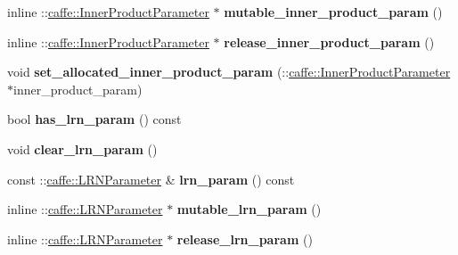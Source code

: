 \begin{DoxyCompactItemize}
inline \+::\mbox{\hyperlink{classcaffe_1_1_inner_product_parameter}{caffe\+::\+Inner\+Product\+Parameter}} $\ast$ {\bfseries mutable\+\_\+inner\+\_\+product\+\_\+param} ()
\item 
\mbox{\label{classcaffe_1_1_v1_layer_parameter_a778f2e5d0dff3de9b4e04279e3172027}} 
inline \+::\mbox{\hyperlink{classcaffe_1_1_inner_product_parameter}{caffe\+::\+Inner\+Product\+Parameter}} $\ast$ {\bfseries release\+\_\+inner\+\_\+product\+\_\+param} ()
\item 
\mbox{\label{classcaffe_1_1_v1_layer_parameter_ac0701e052c33512b9f791a1fada839aa}} 
void {\bfseries set\+\_\+allocated\+\_\+inner\+\_\+product\+\_\+param} (\+::\mbox{\hyperlink{classcaffe_1_1_inner_product_parameter}{caffe\+::\+Inner\+Product\+Parameter}} $\ast$inner\+\_\+product\+\_\+param)
\item 
\mbox{\label{classcaffe_1_1_v1_layer_parameter_a40a8916bff16c864d376e87cde0b459b}} 
bool {\bfseries has\+\_\+lrn\+\_\+param} () const
\item 
\mbox{\label{classcaffe_1_1_v1_layer_parameter_a5053760676afa2bd3053c35730d5e420}} 
void {\bfseries clear\+\_\+lrn\+\_\+param} ()
\item 
\mbox{\label{classcaffe_1_1_v1_layer_parameter_ad1ce1def22e066234da6782de2464129}} 
const \+::\mbox{\hyperlink{classcaffe_1_1_l_r_n_parameter}{caffe\+::\+L\+R\+N\+Parameter}} \& {\bfseries lrn\+\_\+param} () const
\item 
\mbox{\label{classcaffe_1_1_v1_layer_parameter_a71ee8f7f501735151b687a490785112e}} 
inline \+::\mbox{\hyperlink{classcaffe_1_1_l_r_n_parameter}{caffe\+::\+L\+R\+N\+Parameter}} $\ast$ {\bfseries mutable\+\_\+lrn\+\_\+param} ()
\item 
\mbox{\label{classcaffe_1_1_v1_layer_parameter_aa8f4cd0765adf25d39e413a72e23ae2f}} 
inline \+::\mbox{\hyperlink{classcaffe_1_1_l_r_n_parameter}{caffe\+::\+L\+R\+N\+Parameter}} $\ast$ {\bfseries release\+\_\+lrn\+\_\+param} ()
\item 
\mbox{\label{classcaffe_1_1_v1_layer_parameter_a90fd6fc2625f1dead6155a52f6cbdd9e}} 

\end{DoxyCompactItemize}
